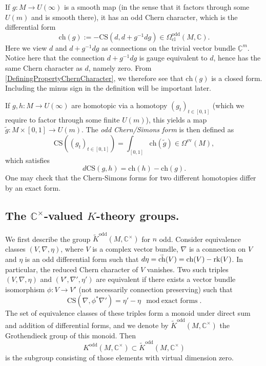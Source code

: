 \documentclass[a4paper]{book}
\newcommand{\bC}{\mathbb{C}}
\newcommand{\ch}{\mathrm{ch}}
\theoremstyle{definition}
\theoremstyle{remark}
\numberwithin{equation}{section}
\begin{document}
\medskip



If $g : M \to U(\infty)$ is a smooth map (in the sense that it factors through some $U(m)$ and is smooth there), it has an odd Chern character, which is the differential form
\[
\ch(g) := -\mathrm{CS}(d, d+g^{-1}dg) \in \Omega^{\mathrm{odd}}_{\mathrm{cl}}(M, \bC).
\]
Here we view $d$ and $d+ g^{-1}dg$ as connections on the trivial vector bundle $\underline{\bC}^m$. Notice here that the connection $d+ g^{-1}dg$ is gauge equivalent to $d$, hence has the same Chern character as $d$, namely zero. From \cref{DefiningPropertyChernCharacter}, we therefore see that $\ch(g)$ is a closed form. Including the minus sign in the definition will be important later.

If $g, h : M \to U(\infty)$ are homotopic via a homotopy $(g_t)_{t \in [0, 1]}$ (which we require to factor through some finite $U(m)$), this yields a map $\tilde{g} : M \times [0, 1] \to U(m)$. The \emph{odd Chern/Simons form} is then defined as
\[
\mathrm{CS}((g_t)_{t \in [0, 1]}) = \int_{[0, 1]} \ch(\tilde{g}) \in \Omega^{\mathrm{ev}}(M),
\]
which satisfies
\[
d \mathrm{CS}(g, h) = \ch(h) - \ch(g).
\]
One may check that the Chern-Simons forms for two different homotopies differ by an exact form.
%



\subsection{The \texorpdfstring{$\bC^\times$}{C}-valued \texorpdfstring{$K$}{K}-theory groups.}
We first describe the group $\tilde{K}^{\mathrm{odd}}(M, \bC^\times)$ for $n$ odd. Consider equivalence classes $(V, \nabla, \eta)$, where $V$ is a complex vector bundle, $\nabla$ is a connection on $V$ and $\eta$ is an odd differential form such that $d\eta = \smash{\widetilde{\ch}}(V) = \ch(V) - \mathrm{rk}(V)$. In particular, the reduced Chern character of $V$ vanishes. Two such triples $(V, \nabla, \eta)$ and $(V', \nabla', \eta')$ are equivalent if there exists a vector bundle isomorphism $\phi : V \to V'$ (not necessarily connection preserving) such that
\[
\mathrm{CS}(\nabla, \phi^*\nabla') = \eta' - \eta \mod \text{exact forms}.
\]
The set of equivalence classes of these triples form a monoid under direct sum and addition of differential forms, and we denote by $\tilde{K}^{\mathrm{odd}}(M, \bC^\times)$ the Grothendieck group of this monoid. Then
\[
K^{\mathrm{odd}}(M, \bC^\times) \subset \tilde{K}^{\mathrm{odd}}(M, \bC^\times)
\] 
is the subgroup consisting of those elements with virtual dimension zero.
\end{document}
